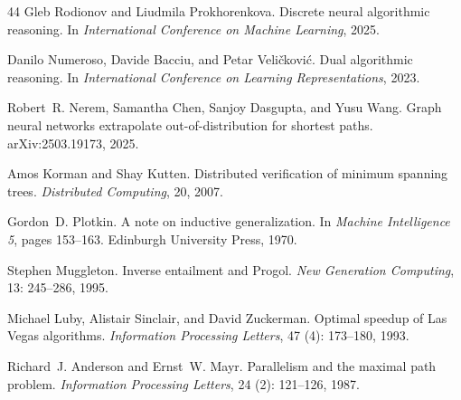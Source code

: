 \documentclass[10pt]{article}
\begin{document}
\begin{thebibliography}{44}
Gleb Rodionov and Liudmila Prokhorenkova.
\newblock Discrete neural algorithmic reasoning.
\newblock In \emph{International Conference on Machine Learning}, 2025.

Danilo Numeroso, Davide Bacciu, and Petar Veli{\v{c}}kovi{\'c}.
\newblock Dual algorithmic reasoning.
\newblock In \emph{International Conference on Learning Representations}, 2023.

Robert~R. Nerem, Samantha Chen, Sanjoy Dasgupta, and Yusu Wang.
\newblock Graph neural networks extrapolate out-of-distribution for shortest
  paths.
\newblock arXiv:2503.19173, 2025.

Amos Korman and Shay Kutten.
\newblock Distributed verification of minimum spanning trees.
\newblock \emph{Distributed Computing}, 20, 2007.

Gordon~D. Plotkin.
\newblock A note on inductive generalization.
\newblock In \emph{Machine Intelligence 5}, pages 153--163. Edinburgh
  University Press, 1970.

Stephen Muggleton.
\newblock Inverse entailment and {P}rogol.
\newblock \emph{New Generation Computing}, 13: 245--286, 1995.

Michael Luby, Alistair Sinclair, and David Zuckerman.
\newblock Optimal speedup of {L}as {V}egas algorithms.
\newblock \emph{Information Processing Letters}, 47 (4):
  173--180, 1993.

Richard~J. Anderson and Ernst~W. Mayr.
\newblock Parallelism and the maximal path problem.
\newblock \emph{Information Processing Letters}, 24 (2):
  121--126, 1987.

\end{thebibliography}
\end{document}
